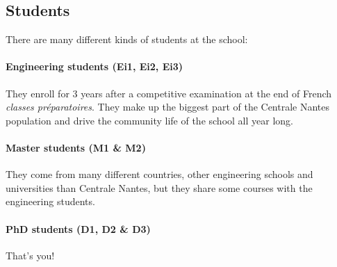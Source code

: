 \subsection{Students}
There are many different kinds of students at the school:
\paragraph{Engineering students (Ei1, Ei2, Ei3)} They enroll for 3 years after a competitive examination at the end of French \textit{classes préparatoires}. They make up the biggest part of the Centrale Nantes population and drive the community life of the school all year long. %
\paragraph{Master students (M1 \& M2)} They come from many different countries, other engineering schools and universities than Centrale Nantes, but they share some courses with the engineering students. %
\paragraph{PhD students (D1, D2 \& D3)} That's you!

